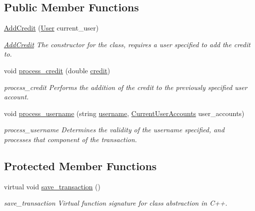 \subsection*{Public Member Functions}
\begin{DoxyCompactItemize}
\item 
\hyperlink{class_add_credit_a024a07a58635a4f70b71746666ddfbe0}{Add\-Credit} (\hyperlink{class_user}{User} current\-\_\-user)
\begin{DoxyCompactList}\small\item\em \hyperlink{class_add_credit}{Add\-Credit} The constructor for the class, requires a user specified to add the credit to. \end{DoxyCompactList}\item 
void \hyperlink{class_add_credit_a38a5999e3af1e44149e75f399e2f0846}{process\-\_\-credit} (double \hyperlink{class_add_credit_aa559c3686bb9d38c3335c16bbea07be8}{credit})
\begin{DoxyCompactList}\small\item\em process\-\_\-credit Performs the addition of the credit to the previously specified user account. \end{DoxyCompactList}\item 
void \hyperlink{class_add_credit_ac47c27071fa4977b64633b429f2d8bc0}{process\-\_\-username} (string \hyperlink{class_add_credit_aad02f271a6536fa078c6d1369ffdadc4}{username}, \hyperlink{class_current_user_accounts}{Current\-User\-Accounts} user\-\_\-accounts)
\begin{DoxyCompactList}\small\item\em process\-\_\-username Determines the validity of the username specified, and processes that component of the transaction. \end{DoxyCompactList}\end{DoxyCompactItemize}
\subsection*{Protected Member Functions}
\begin{DoxyCompactItemize}
\item 
virtual void \hyperlink{class_add_credit_a8e5996ad33eb07eef44f55deba6c298e}{save\-\_\-transaction} ()
\begin{DoxyCompactList}\small\item\em save\-\_\-transaction Virtual function signature for class abstraction in C++. \end{DoxyCompactList}\end{DoxyCompactItemize}

